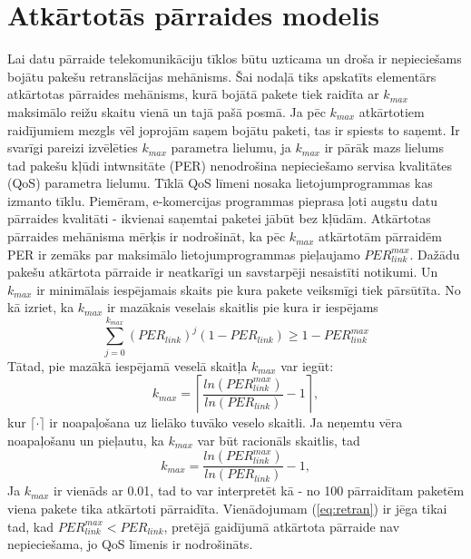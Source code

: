 \section{Atkārtotās pārraides modelis}\label{sec:retr}
Lai datu pārraide telekomunikāciju tīklos būtu uzticama un droša ir nepieciešams bojātu pakešu retranslācijas mehānisms. Šai nodaļā tiks apskatīts elementārs atkārtotas pārraides mehānisms, kurā bojātā pakete tiek raidīta ar $k_{max}$ maksimālo reižu skaitu vienā un tajā pašā posmā. Ja pēc $k_{max}$ atkārtotiem raidījumiem mezgls vēl joprojām saņem bojātu paketi, tas ir spiests to saņemt. Ir svarīgi pareizi izvēlēties $k_{max}$ parametra lielumu, ja $k_{max}$ ir pārāk mazs lielums tad pakešu kļūdi intwnsitāte (\acs{PER}) nenodrošina nepieciešamo servisa kvalitātes (\acs{QoS}) parametra lielumu. Tīklā QoS līmeni nosaka lietojumprogrammas kas izmanto tīklu. Piemēram, e-komercijas programmas pieprasa ļoti augstu datu pārraides kvalitāti - ikvienai saņemtai paketei jābūt bez kļūdām. Atkārtotas pārraides mehānisma mērķis ir nodrošināt, ka pēc $k_{max}$ atkārtotām pārraidēm PER ir zemāks par maksimālo lietojumprogrammas pieļaujamo $PER^{max}_{link}$. Dažādu pakešu atkārtota pārraide ir neatkarīgi un savstarpēji nesaistīti notikumi. Un $k_{max}$ ir minimālais iespējamais skaits pie kura pakete veiksmīgi tiek pārsūtīta. No kā izriet, ka $k_{max}$ ir mazākais veselais skaitlis pie kura ir iespējams
\begin{equation}
\sum^{k_{max}}_{j=0}\left(PER_{link}\right)^{j}\left(1-PER_{link}\right)\geq 1-PER_{link}^{max}
\end{equation}
Tātad, pie mazākā iespējamā veselā skaitļa $k_{max}$ var iegūt:
\begin{equation}
k_{max}=\left\lceil\frac{ln(PER_{link}^{max})}{ln(PER_{link})}-1\right\rceil ,
\end{equation}
kur $\lceil\cdot\rceil$ ir noapaļošana uz lielāko tuvāko veselo skaitli. Ja neņemtu vēra noapaļošanu un pieļautu, ka $k_{max}$ var būt racionāls skaitlis, tad
\begin{equation}
k_{max}=\frac{ln(PER_{link}^{max})}{ln(PER_{link})}-1 ,
\label{eq:retran}
\end{equation}
Ja $k_{max}$ ir vienāds ar 0.01, tad to var interpretēt kā - no 100 pārraidītam paketēm viena pakete tika atkārtoti pārraidīta. Vienādojumam (\ref{eq:retran}) ir jēga tikai tad, kad $PER^{max}_{link}<PER_{link}$, pretējā gaidījumā atkārtota pārraide nav nepieciešama, jo QoS līmenis ir nodrošināts.


